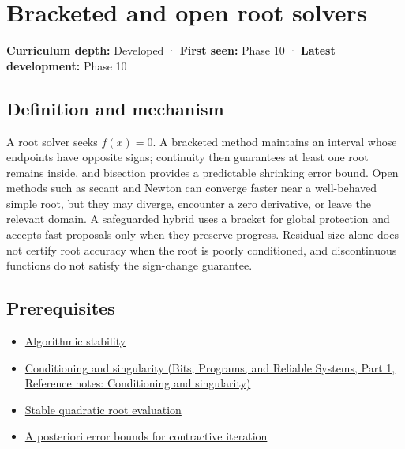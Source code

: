 \hypertarget{appendix-f63eb850796d}{}\label{referencestart:appendix-f63eb850796d}
\section{Bracketed and open root solvers}\label{appendix-f63eb850796d-bracketed-and-open-root-solvers}

\hypertarget{appendix-f63eb850796d-bracketed-and-open-root-solvers}{}

\textbf{Curriculum depth:} Developed · \textbf{First seen:} Phase 10 · \textbf{Latest development:} Phase 10

\begin{allmightroledefinition}

\subsection{Definition and mechanism}\label{appendix-f63eb850796d-definition-and-mechanism}

\hypertarget{appendix-f63eb850796d-definition-and-mechanism}{}

A root solver seeks \(f(x)=0\). A bracketed method maintains an interval whose endpoints have opposite signs; continuity then guarantees at least one root remains inside, and bisection provides a predictable shrinking error bound. Open methods such as secant and Newton can converge faster near a well-behaved simple root, but they may diverge, encounter a zero derivative, or leave the relevant domain. A safeguarded hybrid uses a bracket for global protection and accepts fast proposals only when they preserve progress. Residual size alone does not certify root accuracy when the root is poorly conditioned, and discontinuous functions do not satisfy the sign-change guarantee.

\end{allmightroledefinition}

\subsection{Prerequisites}\label{appendix-f63eb850796d-prerequisites}

\hypertarget{appendix-f63eb850796d-prerequisites}{}

\begin{itemize}
\tightlist
\item
  \hyperref[appendix-aa2bf0d79639]{Algorithmic stability}
\item
  \href{../01-Bits-Programs-and-Reliable-Systems-P01/main.pdf\#appendix-8f6a01f284a7}{Conditioning and singularity (Bits, Programs, and Reliable Systems, Part 1, Reference notes: Conditioning and singularity)}
\item
  \hyperref[appendix-b9afba7f63e5]{Stable quadratic root evaluation}
\item
  \hyperref[appendix-d83b0ad1be7f]{A posteriori error bounds for contractive iteration}
\end{itemize}

